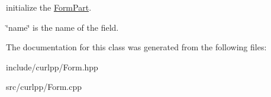 initialize the \hyperlink{classcurlpp_1_1FormPart}{Form\-Part}. 

\char`\"{}name\char`\"{} is the name of the field. 

The documentation for this class was generated from the following files\-:\begin{DoxyCompactItemize}
\item 
include/curlpp/Form.\-hpp\item 
src/curlpp/Form.\-cpp\end{DoxyCompactItemize}
